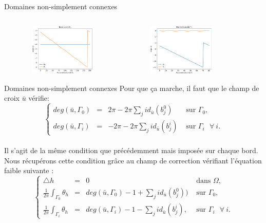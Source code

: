 \documentclass[compress,10pt,aspectratio=169]{beamer}
\begin{document}
\begin{frame}{Domaines non-simplement connexes}
\begin{columns}
\begin{column}{0.18\textwidth}
\end{column}
\end{columns}
\vspace{0.05cm}
\centering
\includegraphics[width=6cm, height=2.45cm]{images/courbe_1.pdf}\hspace{0.6cm}
\includegraphics[width=6cm, height=2.45cm]{images/courbe_0.pdf}
\end{frame}



\begin{frame}{Domaines non-simplement connexes}{}
\small
Pour que ça marche, il faut que le champ de croix $\bar{u}$ vérifie:\\\vspace{0.2cm}
\begin{equation*}
\left\{
\begin{array}{lcll}
   deg(\bar{u},\Gamma_0)&=&2\pi-2\pi\sum_j id_{\bar{u}}(b_j^0)&\mbox{ sur }\Gamma_0,\\[0.3cm]
   deg(\bar{u}, \Gamma_i)&=&-2\pi-2\pi\sum_j id_{\bar{u}}(b_j^i)&\mbox{ sur }\Gamma_i~~~\forall~i.
\end{array}
\right.
\end{equation*}
\\\vspace{0.2cm}
{\color{onera_gray} Il s'agit de la même condition que précédemment mais imposée sur chaque bord.}\\\vspace{0.12cm}
Nous récupérons cette condition grâce au champ de correction vérifiant l'équation faible suivante :
\vspace{0.12cm}
\begin{equation*}
\left\{
\begin{array}{lcll}
    \triangle h &= &0 &\mbox{ dans }\Omega,\\[0.25cm]
    \displaystyle\frac{1}{2\pi}\int_{\Gamma_0}\theta_h &=& deg(\bar{u}, \Gamma_0)-1+\sum_j id_{\bar{u}}(b_j^0))&\mbox{ sur } \Gamma_0,\\[0.25cm]
    \displaystyle\frac{1}{2\pi}\int_{\Gamma_i}\theta_h& =& deg(\bar{u}, \Gamma_i)-1-\sum_j id_{\bar{u}}(b_j^i),&\mbox{ sur }\Gamma_i~~~\forall~i.
\end{array}
\right.
\end{equation*}

\end{frame}
\end{document}

